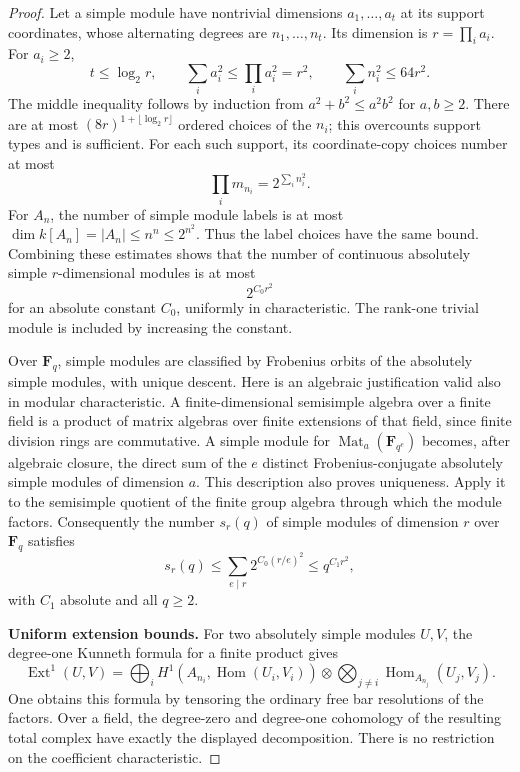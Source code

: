 \begin{proof}
Let a simple module have nontrivial dimensions
\(a_1,\ldots,a_t\) at its support coordinates, whose alternating
degrees are \(n_1,\ldots,n_t\). Its dimension is
\(r=\prod_i a_i\). For \(a_i\geq2\),
\[
 t\leq\log_2r,\qquad
 \sum_i a_i^2\leq\prod_i a_i^2=r^2,\qquad
 \sum_i n_i^2\leq64r^2.
 \tag{A4}
\]
The middle inequality follows by induction from
\(a^2+b^2\leq a^2b^2\) for \(a,b\geq2\).
There are at most \((8r)^{1+\lfloor\log_2r\rfloor}\) ordered choices
of the \(n_i\); this overcounts support types and is sufficient.
For each such support, its coordinate-copy choices number at most
\[
 \prod_i m_{n_i}=2^{\sum_i n_i^2}.
\]
For \(A_n\), the number of simple module labels is at most
\(\dim k[A_n]=|A_n|\leq n^n\leq2^{n^2}\).
Thus the label choices have the same bound.
Combining these estimates shows that the number of continuous
absolutely simple \(r\)-dimensional modules is at most
\[
 2^{C_0r^2}
 \tag{A5}
\]
for an absolute constant \(C_0\), uniformly in characteristic.
The rank-one trivial module is included by increasing the constant.

Over \(\mathbf F_q\), simple modules are classified by Frobenius
orbits of the absolutely simple modules, with unique descent.
Here is an algebraic justification valid also in modular
characteristic. A finite-dimensional semisimple algebra over
a finite field is a product of matrix algebras over finite
extensions of that field, since finite division rings are
commutative. A simple module for
\(\operatorname{Mat}_a(\mathbf F_{q^e})\) becomes, after algebraic
closure, the direct sum of the \(e\) distinct Frobenius-conjugate
absolutely simple modules of dimension \(a\). This description
also proves uniqueness. Apply it to the semisimple quotient of
the finite group algebra through which the module factors.
Consequently the number \(s_r(q)\) of simple modules of dimension
\(r\) over \(\mathbf F_q\) satisfies
\[
 s_r(q)\leq\sum_{e\mid r}2^{C_0(r/e)^2}
             \leq q^{C_1r^2},
 \tag{A6}
\]
with \(C_1\) absolute and all \(q\geq2\).

\par\smallskip\noindent\textbf{Uniform extension bounds.}\quad
For two absolutely simple modules \(U,V\), the degree-one
Kunneth formula for a finite product gives
\[
 \operatorname{Ext}^1(U,V)=
 \bigoplus_i
 H^1\!\left(A_{n_i},\operatorname{Hom}(U_i,V_i)\right)
       \otimes\!\!\bigotimes_{j\ne i}
                  \operatorname{Hom}_{A_{n_j}}(U_j,V_j).
 \tag{A7}
\]
One obtains this formula by tensoring the ordinary free bar
resolutions of the factors. Over a field, the degree-zero and
degree-one cohomology of the resulting total complex have exactly
the displayed decomposition. There is no restriction on the
coefficient characteristic.


\end{proof}
